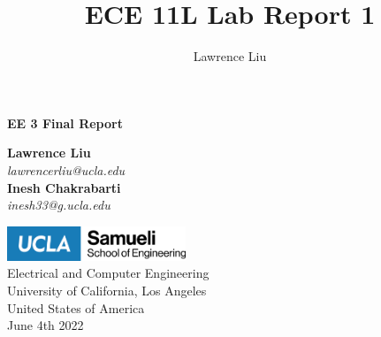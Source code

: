 \documentclass[12pt]{article}
\title{ECE 11L Lab Report 1}
\author{Lawrence Liu}
\begin{document}
\begin{titlepage}
   \begin{center}
        \vspace*{3cm}
        \Huge
        \textbf{EE 3 Final Report}
                
        \vspace{4cm}
        \Large
        \textbf{Lawrence Liu} \\
        \normalsize   
        \textit{lawrencerliu@ucla.edu}\\
        \vspace{1cm}
        \Large
        \textbf{Inesh Chakrabarti} \\
        \normalsize   
        \textit{inesh33@g.ucla.edu}\\

        \vspace{2cm}
            
        \includegraphics[width=0.4\textwidth]{UCLA.png}\\
        \vspace{1cm}
        \large
        Electrical and Computer Engineering\\
        University of California, Los Angeles\\
        United States of America\\
        June 4th 2022
   \end{center}
\end{titlepage}
\end{document}
